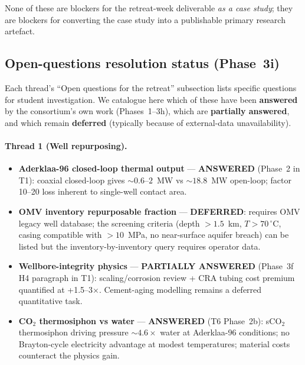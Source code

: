 \documentclass{article}
\begin{document}
None of these are blockers for the retreat-week deliverable
\emph{as a case study}; they are blockers for converting the
case study into a publishable primary research artefact.

\subsection*{Open-questions resolution status (Phase~3i)}

Each thread's ``Open questions for the retreat'' subsection lists
specific questions for student investigation. We catalogue here which
of these have been \textbf{answered} by the consortium's own work
(Phases~1--3h), which are \textbf{partially answered}, and which
remain \textbf{deferred} (typically because of external-data
unavailability).

\paragraph{Thread 1 (Well repurposing).}
\begin{itemize}
\item \textbf{Aderklaa-96 closed-loop thermal output} ---
\textbf{ANSWERED} (Phase~2 in T1): coaxial closed-loop gives
$\sim 0.6$--$2$~MW vs $\sim 18.8$~MW open-loop; factor 10--20 loss
inherent to single-well contact area.
\item \textbf{OMV inventory repurposable fraction} ---
\textbf{DEFERRED}: requires OMV legacy well database; the screening
criteria (depth $> 1.5$~km, $T > 70\,^\circ$C, casing
compatible with $> 10$~MPa, no near-surface aquifer breach) can be
listed but the inventory-by-inventory query requires operator data.
\item \textbf{Wellbore-integrity physics} --- \textbf{PARTIALLY ANSWERED}
(Phase~3f H4 paragraph in T1): scaling/corrosion review + CRA tubing
cost premium quantified at +1.5--3$\times$. Cement-aging modelling
remains a deferred quantitative task.
\item \textbf{CO$_2$ thermosiphon vs water} --- \textbf{ANSWERED}
(T6 Phase~2b): sCO$_2$ thermosiphon driving pressure
$\sim 4.6\times$ water at Aderklaa-96 conditions; no Brayton-cycle
electricity advantage at modest temperatures; material costs
counteract the physics gain.
\end{itemize}
\end{document}
